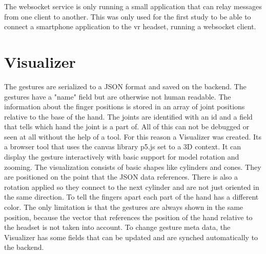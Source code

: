 The websocket service is only running a small application that can relay messages from one client to another. This was only used for the first study to be able to connect a smartphone application to the vr headset, running a websocket client.








\section{Visualizer}

The gestures are serialized to a JSON format and saved on the backend. The gestures have a "name" field but are otherwise not human readable. The information about the finger positions is stored in an array of joint positions relative to the base of the hand. The joints are identified with an id and a field that tells which hand the joint is a part of. All of this can not be debugged or seen at all without the help of a tool. For this reason a Visualizer was created. Its a browser tool that uses the canvas library p5.js set to a 3D context. It can display the gesture interactively with basic support for model rotation and zooming. The visualization consists of basic shapes like cylinders and cones. They are positioned on the point that the JSON data references. There is also a rotation applied so they connect to the next cylinder and are not just oriented in the same direction. To tell the fingers apart each part of the hand has a different color. The only limitation is that the gestures are always shown in the same position, because the vector that references the position of the hand relative to the headset is not taken into account. To change gesture meta data, the Visualizer has some fields that can be updated and are synched automatically to the backend.





